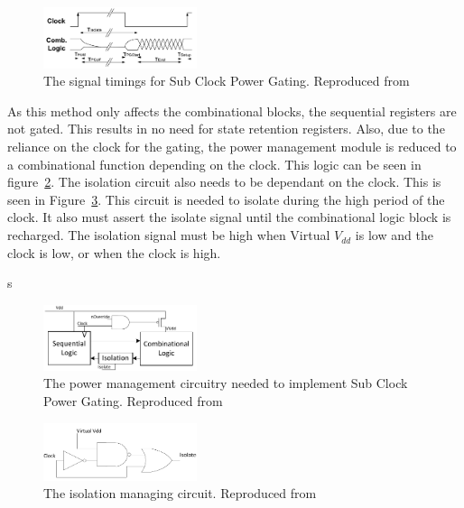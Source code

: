 \begin{figure}
\includegraphics[width=0.4\textwidth]{Figures/scpg_timings.png}
\caption{The signal timings for Sub Clock Power Gating. Reproduced from \cite{mistry2011sub}}
\label{fig:scpg:timing}
\end{figure}


As this method only affects the combinational blocks, the sequential registers are not gated.
This results in no need for state retention registers.
Also, due to the reliance on the clock for the gating, the power management module is reduced to a combinational function depending on the clock. 
This logic can be seen in figure~\ref{fig:scpg:gate}. 
The isolation circuit also needs to be dependant on the clock.
This is seen in Figure~\ref{fig:scpg:iso}.
This circuit is needed to isolate during the high period of the clock. 
It also must assert the isolate signal until the combinational logic block is recharged. 
The isolation signal must be high when Virtual $V_{dd}$ is low and the clock is low, or when the clock is high. 

s
\begin{figure}
\includegraphics[width=0.4\textwidth]{Figures/mistry_gating.pdf}%
\caption{The power management circuitry needed to implement Sub Clock Power Gating. Reproduced from \cite{mistry2011sub}}
\label{fig:scpg:gate}
\end{figure}
\begin{figure}
\includegraphics[width=0.4\textwidth]{Figures/mistry_isolation.pdf}%
\caption{The isolation managing circuit. Reproduced from \cite{mistry2011sub}}
\label{fig:scpg:iso}
\end{figure}

